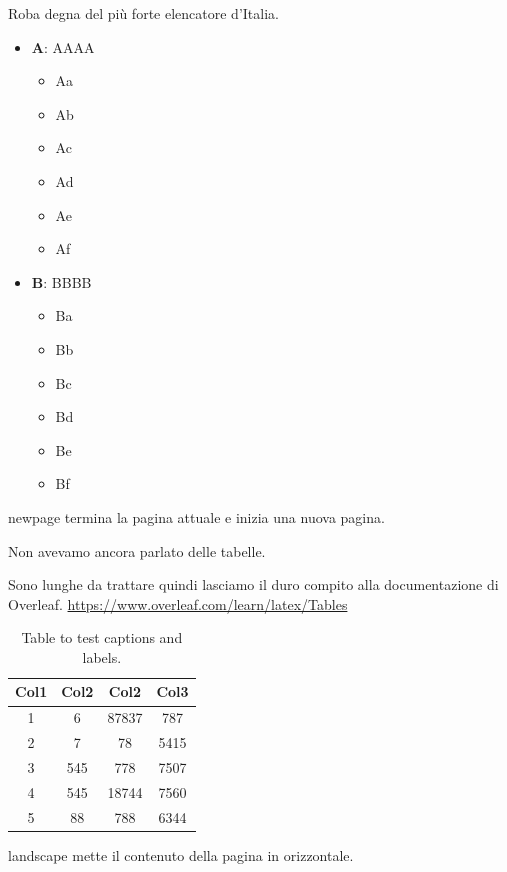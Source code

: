 \documentclass[envcountsame,envcountchap]{svmono}
\begin{document}
Roba degna del più forte elencatore d'Italia. \citep{elencatoreSeriale}
\begin{itemize}
    \item \textbf{A}: AAAA
    \begin{itemize}
        \item Aa
        \item Ab
        \item Ac
        \item Ad
        \item Ae
        \item Af
    \end{itemize} 
    \item \textbf{B}: BBBB
    \begin{itemize}
        \item Ba
        \item Bb
        \item Bc
        \item Bd
        \item Be
        \item Bf
    \end{itemize}
\end{itemize}

\newpage
newpage termina la pagina attuale e inizia una nuova pagina.

\vspace*{2cm}

Non avevamo ancora parlato delle tabelle.

Sono lunghe da trattare quindi lasciamo il duro compito alla documentazione di Overleaf.
\url{https://www.overleaf.com/learn/latex/Tables}

\begin{table}[h!]
\centering
\begin{tabular}{||c c c c||} 
    \hline
    Col1 & Col2 & Col2 & Col3 \\ [0.5ex] 
    \hline\hline
    1 & 6 & 87837 & 787 \\ 
    2 & 7 & 78 & 5415 \\
    3 & 545 & 778 & 7507 \\
    4 & 545 & 18744 & 7560 \\
    5 & 88 & 788 & 6344 \\ [1ex] 
    \hline
\end{tabular}
\caption{Table to test captions and labels.}
\label{table:1}
\end{table}


\newpage
\begin{landscape}
landscape mette il contenuto della pagina in orizzontale.
\end{landscape}
    
\end{document}
